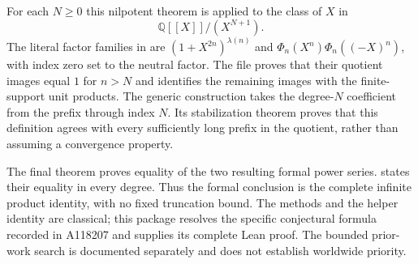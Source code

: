 For each $N\ge0$ this nilpotent theorem is applied to the class of $X$ in
\[
 \mathbb{Q}[[X]]/(X^{N+1}).
\]
The literal factor families in  are
$(1+X^{2n})^{\lambda(n)}$ and
$\Phi_n(X^n)\Phi_n((-X)^n)$, with index zero set to the neutral factor.
The file proves that their quotient images equal $1$ for $n>N$ and
identifies the remaining images with the finite-support unit products.
The generic construction  takes the degree-$N$
coefficient from the prefix through index $N$. Its stabilization theorem
proves that this definition agrees with every sufficiently long prefix
in the quotient, rather than assuming a convergence property.

The final theorem  proves equality of
the two resulting formal power series.
 states their equality in
every degree. Thus the formal conclusion is the complete infinite
product identity, with no fixed truncation bound. The methods and
the helper identity are classical; this package resolves the specific
conjectural formula recorded in A118207 and supplies its complete Lean
proof. The bounded prior-work search is documented separately and does
not establish worldwide priority.
